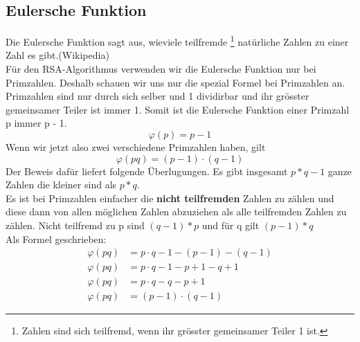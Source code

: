 \subsection{Eulersche Funktion}
Die Eulersche Funktion sagt aus, wieviele teilfremde \footnote{Zahlen sind sich teilfremd, wenn ihr grösster gemeinsamer Teiler 1 ist.} natürliche Zahlen zu einer Zahl es gibt.(Wikipedia)\\
Für den RSA-Algorithmus verwenden wir die Eulersche Funktion nur bei Primzahlen. Deshalb schauen wir uns nur die spezial Formel bei Primzahlen an.\\
Primzahlen sind nur durch sich selber und 1 dividirbar und ihr grösster gemeinsamer Teiler ist immer 1. Somit ist die Eulersche Funktion einer Primzahl p immer p - 1.
%
\begin{equation*}
  \varphi(p) = p - 1
\end{equation*}
%
Wenn wir jetzt also zwei verschiedene Primzahlen haben, gilt
\begin{equation}
  \varphi(pq) = (p - 1) \cdot (q - 1)
  \label{eqn:eulersche_func}
\end{equation}
Der Beweis dafür liefert folgende Überlugungen. Es gibt insgesamt $ p * q -1 $ ganze Zahlen die kleiner sind als $ p * q $.\\
Es ist bei Primzahlen einfacher die \textbf{nicht teilfremden} Zahlen zu zählen und diese dann von allen möglichen Zahlen abzuziehen als alle teilfremden Zahlen zu zählen. Nicht teilfremd zu p sind $ (q - 1) * p $ und für q gilt $ (p - 1) * q $\\
Als Formel geschrieben:
%
\begin{equation*}
  \begin{split}
    \varphi(pq) & = p \cdot q -1 - (p - 1) - (q - 1)  \\
    \varphi(pq) & = p \cdot q -1 - p + 1 - q + 1  \\
    \varphi(pq) & = p \cdot q -q - p + 1  \\
    \varphi(pq) & = (p -1) \cdot (q - 1)
    \label{eqn:herleitung_eulersche_func}
  \end{split}
\end{equation*}
%
